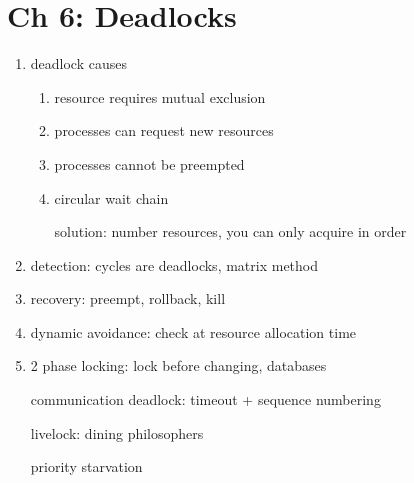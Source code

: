 \documentclass[10pt]{article}
\begin{document}
\section{Ch 6: Deadlocks}
\begin{enumerate}
    \item deadlock causes
        \begin{enumerate}
            \item resource requires mutual exclusion
            \item processes can request new resources
            \item processes cannot be preempted
            \item circular wait chain

                solution: number resources, you can only acquire in order
        \end{enumerate}

    \item detection: cycles are deadlocks, matrix method
    \item recovery: preempt, rollback, kill
    \item dynamic avoidance: check at resource allocation time
    \item 2 phase locking: lock before changing, databases

        communication deadlock: timeout + sequence numbering

        livelock: dining philosophers

        priority starvation
\end{enumerate}
\end{document}
